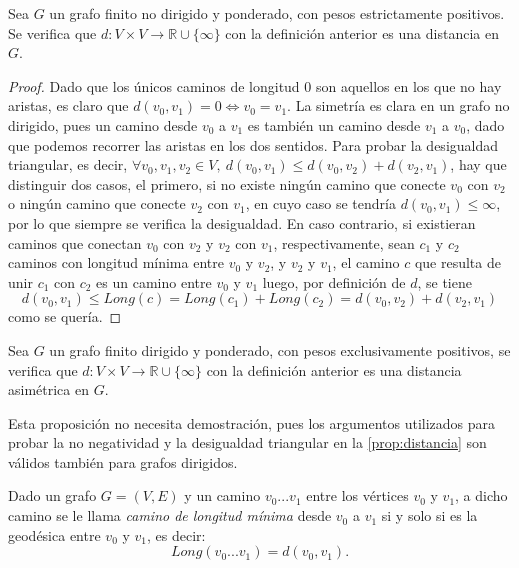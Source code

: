 \begin{proposicion}\label{prop:distancia}
	Sea $G$ un grafo finito no dirigido y ponderado, con pesos estrictamente positivos. Se verifica que $d:V\times V \rightarrow \mathbb{R}\cup \{\infty\}$ con la definición anterior es una distancia en $G$.
\end{proposicion}

\begin{proof}
	Dado que los únicos caminos de longitud $0$ son aquellos en los que no hay aristas, es claro que $d(v_0, v_1) = 0 \Leftrightarrow v_0 = v_1$. La simetría es clara en un grafo no dirigido, pues un camino desde $v_0$ a $v_1$ es también un camino desde $v_1$ a $v_0$, dado que podemos recorrer las aristas en los dos sentidos. Para probar la desigualdad triangular, es decir, $\forall v_0, v_1, v_2 \in V,\ d(v_0,v_1) \leq d(v_0,v_2) + d(v_2,v_1)$, hay que distinguir dos casos, el primero, si no existe ningún camino que conecte $v_0$ con $v_2$ o ningún camino que conecte $v_2$ con $v_1$, en cuyo caso se tendría $d(v_0,v_1)\leq \infty$, por lo que siempre se verifica la desigualdad. En caso contrario, si existieran caminos que conectan $v_0$ con $v_2$ y $v_2$ con $v_1$, respectivamente, sean $c_1$ y $c_2$ caminos con longitud mínima entre $v_0$ y $v_2$, y $v_2$ y $v_1$, el camino $c$ que resulta de unir $c_1$ con $c_2$ es un camino entre $v_0$ y $v_1$ luego, por definición de $d$, se tiene
	$$d(v_0, v_1) \leq Long(c) = Long(c_1)+Long(c_2)=d(v_0,v_2)+d(v_2,v_1)$$
	como se quería.
\end{proof}

\begin{proposicion}
	Sea $G$ un grafo finito dirigido y ponderado, con pesos exclusivamente positivos, se verifica que $d:V\times V \rightarrow \mathbb{R}\cup \{\infty\}$ con la definición anterior es una distancia asimétrica en $G$.
\end{proposicion}

Esta proposición no necesita demostración, pues los argumentos utilizados para probar la no negatividad y la desigualdad triangular en la \autoref{prop:distancia} son válidos también para grafos dirigidos.

\begin{definicion}
	Dado un grafo $G=(V,E)$ y un camino $v_0...v_1$ entre los vértices $v_0$ y $v_1$, a dicho camino se le llama \textit{camino de longitud mínima} desde $v_0$ a $v_1$ si y solo si es la geodésica entre $v_0$ y $v_1$, es decir:
	$$Long(v_0...v_1) = d(v_0, v_1).$$
\end{definicion}

